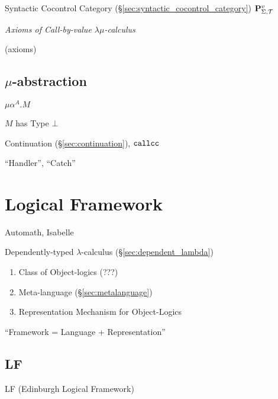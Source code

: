 Syntactic Cocontrol Category
(\S\ref{sec:syntactic_cocontrol_category})
$\mathbf{P}^v_{\Sigma,\mathcal{T}}$ %


\emph{Axioms of Call-by-value $\lambda\mu$-calculus}

(axioms) %




\subsection{$\mu$-abstraction}\label{sec:mu_abstraction}

$\mu\alpha^A.M$

$M$ has Type $\bot$

Continuation (\S\ref{sec:continuation}), $\mathtt{callcc}$

``Handler'', ``Catch'' %



\section{Logical Framework}\label{sec:logical_framework}


Automath, Isabelle

Dependently-typed $\lambda$-calculus (\S\ref{sec:dependent_lambda})

\begin{enumerate}
  \item Class of Object-logics (???)
  \item Meta-language (\S\ref{sec:metalanguage})
  \item Representation Mechanism for Object-Logics
\end{enumerate}

``Framework = Language + Representation''



\subsection{LF}\label{sec:lf}

LF (Edinburgh Logical Framework)

